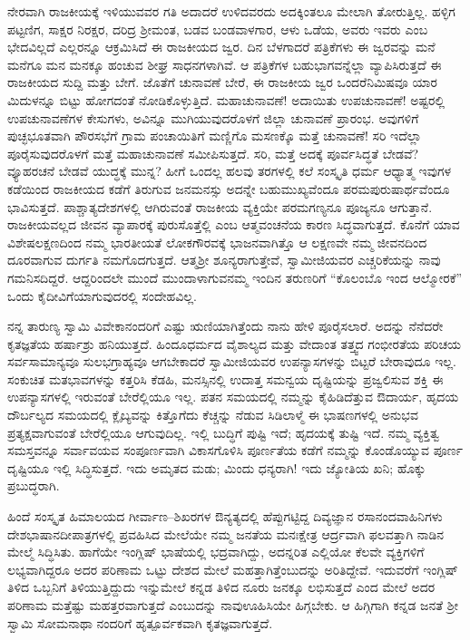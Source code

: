 ನೇರವಾಗಿ ರಾಜಕೀಯಕ್ಕೆ ಇಳಿಯುವವರ ಗತಿ ಅದಾದರೆ ಉಳಿದವರದು ಅದಕ್ಕಿಂತಲೂ ಮೇಲಾಗಿ ತೋರುತ್ತಿಲ್ಲ. ಹಳ್ಳಿಗ ಪಟ್ಟಣಿಗ, ಸಾಕ್ಷರ ನಿರಕ್ಷರ, ದರಿದ್ರ ಶ‍್ರೀಮಂತ, ಬಡವ ಬಂಡವಾಳಗಾರ, ಆಳು ಒಡೆಯ, ಅವರು ಇವರು ಎಂಬ ಭೇದವಿಲ್ಲದೆ ಎಲ್ಲರನ್ನೂ ಆಕ್ರಮಿಸಿದೆ ಈ ರಾಜಕೀಯದ ಜ್ವರ. ದಿನ ಬೆಳಗಾದರೆ ಪತ್ರಿಕೆಗಳು ಈ ಜ್ವರವನ್ನು ಮನೆ ಮನೆಗೂ ಮನ ಮನಕ್ಕೂ ಹಂಚುವ ಶೀಘ್ರ ಸಾಧನಗಳಾಗಿವೆ. ಆ ಪತ್ರಿಕೆಗಳ ಬಹುಭಾಗವನ್ನೆಲ್ಲಾ ವ್ಯಾಪಿಸಿರುತ್ತದೆ ಈ ರಾಜಕೀಯದ ಸುದ್ದಿ ಮತ್ತು ಬೇಗೆ. ಜೊತೆಗೆ ಚುನಾವಣೆ ಬೇರೆ, ಈ ರಾಜಕೀಯ ಜ್ವರ ಒಂದರೆನಿಮಿಷವೂ ಯಾರ ಮಿದುಳನ್ನೂ ಬಿಟ್ಟು ಹೋಗದಂತೆ ನೋಡಿಕೊಳ್ಳುತ್ತಿದೆ. ಮಹಾಚುನಾವಣೆ! ಅದಾಯಿತು ಉಪಚುನಾವಣೆ! ಅಷ್ಟರಲ್ಲಿ ಉಪಚುನಾವಣೆಗಳ ಕೇಸುಗಳು, ಅವಿನ್ನೂ ಮುಗಿಯುವುದರೊಳಗೆ ಜಿಲ್ಲಾ ಚುನಾವಣೆ ಪ್ರಾರಂಭ. ಅವುಗಳಿಗೆ ಪುಚ್ಛಭೂತವಾಗಿ ಪೌರಸಭೆಗೆ ಗ್ರಾಮ ಪಂಚಾಯಿತಿಗೆ ಮಣ್ಣಿಗೊ ಮಸಣಕ್ಕೊ ಮತ್ತೆ ಚುನಾವಣೆ! ಸರಿ ಇದೆಲ್ಲಾ ಪೂರೈಸುವುದರೊಳಗೆ ಮತ್ತೆ ಮಹಾಚುನಾವಣೆ ಸಮೀಪಿಸುತ್ತದೆ. ಸರಿ, ಮತ್ತೆ ಅದಕ್ಕೆ ಪೂರ್ವಸಿದ್ಧತೆ ಬೇಡವೆ? ವ್ಯೂಹರಚನೆ ಬೇಡವೆ ಯುದ್ಧಕ್ಕೆ ಮುನ್ನ? ಹೀಗೆ ಒಂದಲ್ಲ ಹಲವು ತರಗಳಲ್ಲಿ ಕಲೆ ಸಂಸ್ಕೃತಿ ಧರ್ಮ ಆಧ್ಯಾತ್ಮ ಇವುಗಳ ಕಡೆಯಿಂದ ರಾಜಕೀಯದ ಕಡೆಗೆ ತಿರುಗುವ ಜನಮನಸ್ಸು ಅದನ್ನೇ ಬಹುಮುಖ್ಯವೆಂದೂ ಪರಮಪುರುಷಾರ್ಥವೆಂದೂ ಭಾವಿಸುತ್ತದೆ. ಪಾಶ್ಚಾತ್ಯದೇಶಗಳಲ್ಲಿ ಆಗಿರುವಂತೆ ರಾಜಕೀಯ ವ್ಯಕ್ತಿಯೇ ಪರಮಗಣ್ಯನೂ ಪೂಜ್ಯನೂ ಆಗುತ್ತಾನೆ. ರಾಜಕೀಯವಲ್ಲದ ಜೀವನ ವ್ಯಾಪಾರಕ್ಕೆ ಪುರುಸೊತ್ತೆಲ್ಲಿ ಎಂಬ ಆತ್ಮವಂಚನೆಯ ಕಾರಣ ಸಿದ್ಧವಾಗುತ್ತದೆ. ಕೊನೆಗೆ ಯಾವ ವಿಶೇಷಲಕ್ಷಣದಿಂದ ನಮ್ಮ ಭಾರತೀಯತೆ ಲೋಕಗೌರವಕ್ಕೆ ಭಾಜನವಾಗಿತ್ತೊ ಆ ಲಕ್ಷಣವೇ ನಮ್ಮ ಜೀವನದಿಂದ ದೂರವಾಗುವ ದುರ್ಗತಿ ನಮಗೊದಗುತ್ತದೆ. ಆತ್ಮಶ‍್ರೀ ಶೂನ್ಯರಾಗುತ್ತೇವೆ, ಸ್ವಾಮೀಜಿಯವರ ಎಚ್ಚರಿಕೆಯನ್ನು ನಾವು ಗಮನಿಸದಿದ್ದರೆ. ಆದ್ದರಿಂದಲೇ ಮುಂದೆ ಮುಂದಾಳಾಗುವನಮ್ಮ ಇಂದಿನ ತರುಣರಿಗೆ “ಕೊಲಂಬೊ ಇಂದ ಆಲ್ಮೋರಕೆ” ಒಂದು ಕೈದೀವಿಗೆಯಾಗುವುದರಲ್ಲಿ ಸಂದೇಹವಿಲ್ಲ. 

ನನ್ನ ತಾರುಣ್ಯ ಸ್ವಾಮಿ ವಿವೇಕಾನಂದರಿಗೆ ಎಷ್ಟು ಋಣಿಯಾಗಿತ್ತೆಂದು ನಾನು ಹೇಳಿ ಪೂರೈಸಲಾರೆ. ಅದನ್ನು ನೆನೆದರೇ ಕೃತಜ್ಞತೆಯ ಹರ್ಷಾಶ್ರು ಹನಿಯುತ್ತದೆ. ಹಿಂದೂಧರ್ಮದ ವೈಶಾಲ್ಯದ ಮತ್ತು ವೇದಾಂತ ತತ್ತ್ವದ ಗಂಭೀರತೆಯ ಪರಿಚಯ ಸರ್ವಸಾಮಾನ್ಯವೂ ಸುಲಭಗ್ರಾಹ್ಯವೂ ಆಗಬೇಕಾದರೆ ಸ್ವಾಮೀಜಿಯವರ ಉಪನ್ಯಾಸಗಳನ್ನು ಬಿಟ್ಟರೆ ಬೇರಾವುದೂ ಇಲ್ಲ. ಸಂಕುಚಿತ ಮತಭಾವಗಳನ್ನು ಕತ್ತರಿಸಿ ಕೆಡಹಿ, ಮನಸ್ಸಿನಲ್ಲಿ ಉದಾತ್ತ ಸಮನ್ವಯ ದೃಷ್ಟಿಯನ್ನು ಪ್ರಜ್ವಲಿಸುವ ಶಕ್ತಿ ಈ ಉಪನ್ಯಾಸಗಳಲ್ಲಿ ಇರುವಂತೆ ಬೇರೆಲ್ಲಿಯೂ ಇಲ್ಲ. ಪತನ ಸಮಯದಲ್ಲಿ ನಮ್ಮನ್ನು ಕೈಹಿಡಿದೆತ್ತುವ ಔದಾರ್ಯ, ಹೃದಯ ದೌರ್ಬಲ್ಯದ ಸಮಯದಲ್ಲಿ ಕ್ಲೈಬ್ಯವನ್ನು ಕಿತ್ತೊಗೆದು ಕೆಚ್ಚನ್ನು ನೆಡುವ ಸಿಡಿಲಾಳ್ಮೆ ಈ ಭಾಷಣಗಳಲ್ಲಿ ಅನುಭವ ಪ್ರತ್ಯಕ್ಷವಾಗುವಂತೆ ಬೇರೆಲ್ಲಿಯೂ ಆಗುವುದಿಲ್ಲ. ಇಲ್ಲಿ ಬುದ್ಧಿಗೆ ಪುಷ್ಟಿ ಇದೆ; ಹೃದಯಕ್ಕೆ ತುಷ್ಟಿ ಇದೆ. ನಮ್ಮ ವ್ಯಕ್ತಿತ್ವ ಸಮಸ್ತವನ್ನೂ ಸರ್ವಾವಯವ ಸಂಪೂರ್ಣವಾಗಿ ವಿಕಾಸಗೊಳಿಸಿ ಪೂರ್ಣತೆಯ ಕಡೆಗೆ ನಮ್ಮನ್ನು ಕೊಂಡೊಯ್ಯುವ ಪೂರ್ಣ ದೃಷ್ಟಿಯೂ ಇಲ್ಲಿ ಸಿದ್ಧಿಸುತ್ತದೆ. ಇದು ಅಮೃತದ ಮಡು; ಮಿಂದು ಧನ್ಯರಾಗಿ! ಇದು ಜ್ಯೋತಿಯ ಖನಿ; ಹೊಕ್ಕು ಪ್ರಬುದ್ಧರಾಗಿ. 

ಹಿಂದೆ ಸಂಸ್ಕೃತ ಹಿಮಾಲಯದ ಗೀರ್ವಾಣ–ಶಿಖರಗಳ ಔನ್ಯತ್ಯದಲ್ಲಿ ಹೆಪ್ಪುಗಟ್ಟಿದ್ದ ದಿವ್ಯಜ್ಞಾನ ರಸಾನಂದವಾಹಿನಿಗಳು ದೇಶಭಾಷಾನದೀಪಾತ್ರಗಳಲ್ಲಿ ಪ್ರವಹಿಸಿದ ಮೇಲೆಯೇ ನಮ್ಮ ಜನತೆಯ ಮನಃಕ್ಷೇತ್ರ ಆರ್ದ್ರವಾಗಿ ಫಲವತ್ತಾಗಿ ನಾಡಿನ ಮೇಲ್ಮೆ ಸಿದ್ಧಿಸಿತು. ಹಾಗೆಯೇ ಇಂಗ್ಲಿಷ್​ ಭಾಷೆಯಲ್ಲಿ ಭದ್ರವಾಗಿದ್ದು, ಅದನ್ನರಿತ ಎಲ್ಲಿಯೋ ಕೆಲವೇ ವ್ಯಕ್ತಿಗಳಿಗೆ ಲಭ್ಯವಾಗಿದ್ದರೂ ಅದರ ಪರಿಣಾಮ ಒಟ್ಟು ದೇಶದ ಮೇಲೆ ಮಹತ್ತಾಗಿತ್ತೆಂಬುದನ್ನು ಅರಿತಿದ್ದೇವೆ. ಇದುವರೆಗೆ ಇಂಗ್ಲಿಷ್​ ತಿಳಿದ ಒಬ್ಬನಿಗೆ ತಿಳಿಯುತ್ತಿದ್ದುದು ಇನ್ನುಮೇಲೆ ಕನ್ನಡ ತಿಳಿದ ನೂರು ಜನಕ್ಕೂ ಲಭಿಸುತ್ತದೆ ಎಂದ ಮೇಲೆ ಅದರ ಪರಿಣಾಮ ಮತ್ತೆಷ್ಟು ಮಹತ್ತರವಾಗುತ್ತದೆ ಎಂಬುದನ್ನು ನಾವು\break ಊಹಿಸಿಯೇ ಹಿಗ್ಗಬೇಕು. ಆ ಹಿಗ್ಗಿಗಾಗಿ ಕನ್ನಡ ಜನತೆ ಶ‍್ರೀ ಸ್ವಾಮಿ ಸೋಮನಾಥಾ ನಂದರಿಗೆ ಹೃತ್ಪೂರ್ವಕವಾಗಿ ಕೃತಜ್ಞವಾಗುತ್ತದೆ. 

